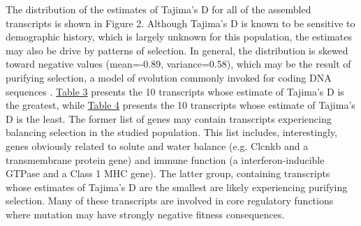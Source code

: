 \documentclass[12pt]{article}
\begin{document}
The distribution of the estimates of Tajima's D for all of the assembled transcripts is shown in Figure 2. Although Tajima's D is known to be sensitive to demographic history, which is largely unknown for this population, the estimates may also be drive by patterns of selection. In general, the distribution is skewed toward negative values (mean=-0.89, variance=0.58), which may be the result of purifying selection, a model of evolution commonly invoked for coding DNA sequences \citep{Chamary:2006db}. \hyperlink{Table 3}{Table 3} presents the 10 transcripts whose estimate of Tajima's D is the greatest, while \hyperlink{Table 4}{Table 4} presents the 10 transcripts whose estimate of Tajima's D is the least. The former list of genes may contain transcripts experiencing balancing selection in the studied population. This list includes, interestingly, genes obviously related to solute and water balance (e.g. Clcnkb and a transmembrane protein gene) and immune function (a interferon-inducible GTPase and a Class 1 MHC gene). The latter group, containing transcripts whose estimates of Tajima's D are the smallest are likely experiencing purifying selection. Many of these transcripts are involved in core regulatory functions where mutation may have strongly negative fitness consequences. \\

\vspace{10mm}
\end{document}
